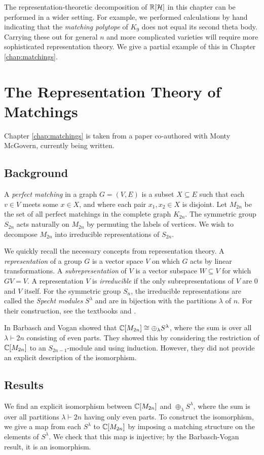 The representation-theoretic decomposition of $\mathbb{R}[\mathcal{H}]$ in this chapter can be performed in a wider setting.
For example, we performed calculations by hand indicating that the {\em matching polytope} of $K_9$ does not equal its second theta body.
Carrying these out for general $n$ and more complicated varieties will require more sophisticated representation theory.
We give a partial example of this in Chapter \ref{chap:matchings}.


\section{The Representation Theory of Matchings}
Chapter \ref{chap:matchings} is taken from a paper co-authored with Monty McGovern, currently being written.

\subsection{Background}
A {\em perfect matching} in a graph $G=(V,E)$ is a subset $X \subseteq E$ such that each $v \in V$ meets some $x \in X$, and where each pair $x_1,x_2 \in X$ is disjoint.
Let $M_{2n}$ be the set of all perfect matchings in the complete graph $K_{2n}$.
The symmetric group $S_{2n}$ acts naturally on $M_{2n}$ by permuting the labels of vertices.
We wish to decompose $M_{2n}$ into irreducible representations of $S_{2n}$.

We quickly recall the necessary concepts from representation theory.
A {\em representation} of a group $G$ is a vector space $V$ on which $G$ acts by linear transformations.
A {\em subrepresentation} of $V$ is a vector subspace $W \subseteq V$ for which $GV = V$.
A representation $V$ is {\em irreducible} if the only subrepresentations of $V$ are 0 and $V$ itself.
For the symmetric group $S_n$, the irreducible representations are called the {\em Specht modules} $S^\lambda$ and are in bijection with the partitions $\lambda$ of $n$.
For their construction, see the textbooks \cite{Sagan} and \cite{Fulton}.


In \cite{bv} Barbasch and Vogan showed that $\mathbb{C}[M_{2n}] \cong \oplus_\lambda S^\lambda$, where the sum is over all $\lambda \vdash 2n$ consisting of even parts.
They showed this by considering the restriction of $\mathbb{C}[M_{2n}]$ to an $S_{2n-1}$-module and using induction.
However, they did not provide an explicit description of the isomorphism.

\subsection{Results}
We find an explicit isomorphism between $\mathbb{C}[M_{2n}]$ and $\oplus_\lambda S^\lambda$, where the sum is over all partitions $\lambda \vdash 2n$ having only even parts.
To construct the isomorphism, we give a map from each $S^\lambda$ to $\mathbb{C}[M_{2n}]$ by imposing a matching structure on the elements of $S^\lambda$.
We check that this map is injective; by the Barbasch-Vogan result, it is an isomorphism.

